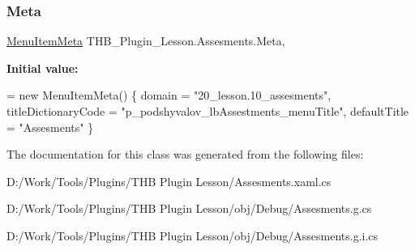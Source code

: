 \subsubsection{\texorpdfstring{Meta}{Meta}}
{\footnotesize\ttfamily \mbox{\hyperlink{class_uniform_client_1_1_plugins_1_1_menu_item_meta}{Menu\+Item\+Meta}} T\+H\+B\+\_\+\+Plugin\+\_\+\+Lesson.\+Assesments.\+Meta\hspace{0.3cm}{\ttfamily [get]}, {\ttfamily [set]}}

{\bfseries Initial value\+:}
\begin{DoxyCode}
= \textcolor{keyword}{new} MenuItemMeta()
        \{
            domain = \textcolor{stringliteral}{"20\_lesson.10\_assesments"},
            titleDictionaryCode = \textcolor{stringliteral}{"p\_podshyvalov\_lbAssestments\_menuTitle"},
            defaultTitle = \textcolor{stringliteral}{"Assesments"}
        \}
\end{DoxyCode}


The documentation for this class was generated from the following files\+:\begin{DoxyCompactItemize}
\item 
D\+:/\+Work/\+Tools/\+Plugins/\+T\+H\+B Plugin Lesson/Assesments.\+xaml.\+cs\item 
D\+:/\+Work/\+Tools/\+Plugins/\+T\+H\+B Plugin Lesson/obj/\+Debug/Assesments.\+g.\+cs\item 
D\+:/\+Work/\+Tools/\+Plugins/\+T\+H\+B Plugin Lesson/obj/\+Debug/Assesments.\+g.\+i.\+cs\end{DoxyCompactItemize}
